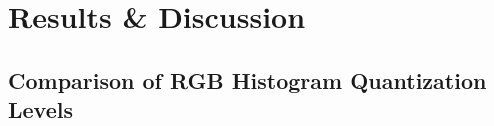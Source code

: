 \pagebreak
\section{Results \& Discussion}\label{disc}

\subsection{Comparison of RGB Histogram Quantization Levels}\label{rgbquantdisc}
%	
